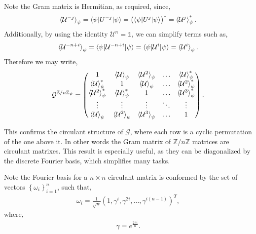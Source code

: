 \documentclass[12pt,letterpaper]{article}
\begin{document}
\begin{multicols}{2}
Note the Gram matrix is Hermitian, as required, since,
\begin{align*}
    \braket{\mathcal{U}^{-j}}_{\psi} = \braket{\psi | U^{-j} | \psi} = \left(\braket{\psi | U^j | \psi}\right)^* = \braket{\mathcal{U}^j}_{\psi}^*.
\end{align*}
Additionally, by using the identity $\mathcal{U}^n = \mathds{1}$, we can simplify terms such as,
\begin{align*}
	\braket{\mathcal{U}^{-n+i}}_\psi = \braket{\psi | \mathcal{U}^{-n+i} | \psi} = \braket{\psi | \mathcal{U}^i | \psi} = \braket{\mathcal{U}^i}_\psi.
\end{align*}
Therefore we may write,
\begin{align*}
	\mathcal{G}^{\mathbb{Z}/n\mathbb{Z}_{\psi}} = \begin{pmatrix}
 1 & \braket{\mathcal{U}}_{\psi} & \braket{\mathcal{U}^{2}}_{\psi} & \hdots &  \braket{\mathcal{U}}_{\psi}^* \\
  \braket{\mathcal{U}}_{\psi}^* & 1 & \braket{\mathcal{U}}_{\psi} & \hdots &  \braket{\mathcal{U}^{2}}_{\psi}^* \\
    \braket{\mathcal{U}^{2}}_{\psi}^* &  \braket{\mathcal{U}}_{\psi}^*  & 1 & \hdots &  \braket{\mathcal{U}^{3}}_{\psi}^* \\
   \vdots & \vdots & \vdots & \ddots & \vdots \\
  \braket{\mathcal{U}}_{\psi} & \braket{\mathcal{U}^{2}}_{\psi}  & \braket{\mathcal{U}^{3}}_{\psi}  & \hdots &  1 
\end{pmatrix}.
\end{align*}

This confirms the circulant structure of $\mathcal{G}$, where each row is a cyclic permutation of the one above it. In other words the Gram matrix of $\mathbb{Z}/n\mathbb{Z}$ matrices are circulant matrixes. This result is especially useful, as they can be diagonalized by the discrete Fourier basis, which simplifies many tasks\cite{circulantMatrices}.

Note the Fourier basis for a $n\times n$ circulant matrix is conformed by the set of vectors $\left\{\omega_i\right\}_{i=1}^n$, such that,
\begin{align*}
	\omega_i=\frac{1}{\sqrt{n}}(1,\gamma^{i},\gamma^{2i},...,\gamma^{i(n-1)})^T,
\end{align*}
where,
\begin{align*}
	\gamma=e^{\frac{2\pi i}{n}}.
\end{align*}


\end{multicols}
\end{document}

